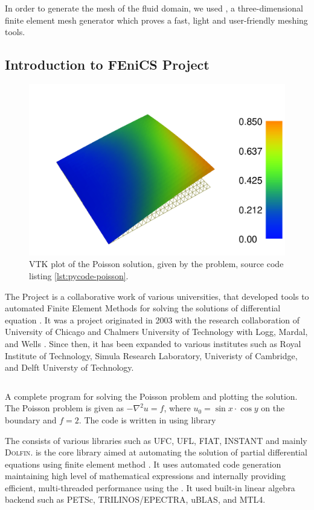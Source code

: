 In order to generate the mesh of the fluid domain, we used \gmsh, a three-dimensional finite element mesh generator which proves a fast, light and user-friendly meshing tools.

\subsection{Introduction to FEniCS Project}

	\begin{figure}[t]
	\centering
	\includegraphics[width=0.5\linewidth]{./figures/eulerian/dolfinExampleFigure-rotated270.pdf}
	\caption{\dolfin VTK plot of the Poisson solution, given by the problem, source code listing \ref{lst:pycode-poisson}.}
	\label{fig:dolfinExampleFigure}
	\end{figure}

The \fenics Project is a collaborative work of various universities, that developed tools to automated Finite Element Methods for solving the solutions of differential equation \cite{FenicsAbout}. It was a project originated in 2003 with the research collaboration of University of Chicago and Chalmers University of Technology with Logg,  Mardal, and Wells \cite{Logg2012a}. Since then, it has been expanded to various institutes such as Royal Institute of Technology, Simula Research Laboratory, Univeristy of Cambridge, and Delft Universty of Technology.

	\begin{listing}[p]
	\inputminted[fontseries=courier,obeytabs,fontsize=\footnotesize,mathescape,linenos,numbersep=5pt,frame=lines,framesep=2mm,xleftmargin=20mm,xrightmargin=20mm]{python}{figures/eulerian/dolfinExample.py}
	\caption{A complete program for solving the Poisson problem and plotting the solution. The Poisson problem is given as $-\nabla^2{u} = f$, where $u_0 = \sin{x}\cdot\cos{y}$ on the boundary and $f=2$. The code is written in \python using  library}
	\label{lst:pycode-poisson}
	\end{listing}

The consists of various libraries such as UFC, UFL, FIAT, INSTANT and mainly \textsc{Dolfin}. \dolfin is the core library aimed at automating the solution of partial differential equations using finite element method \cite{Logg2011}. It uses automated code generation maintaining high level of mathematical expressions and internally providing efficient, multi-threaded performance using the . It used built-in linear algebra backend such as PETSc, TRILINOS/EPECTRA, uBLAS, and MTL4.

